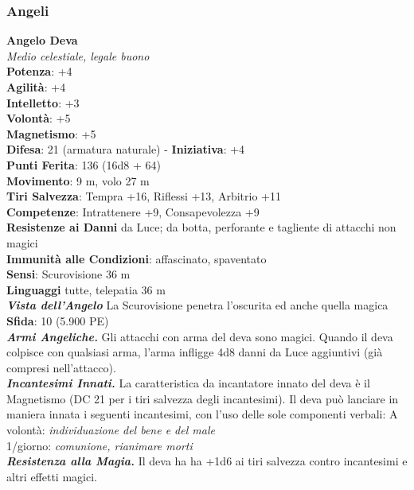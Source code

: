 \begin{multicols}{2}


\subsubsection{Angeli}

\medskip\textbf{Angelo Deva}\\
\emph{Medio celestiale, legale buono}\\
\textbf{Potenza}: +4\\
\textbf{Agilità}: +4\\
\textbf{Intelletto}: +3\\
\textbf{Volontà}: +5\\
\textbf{Magnetismo}: +5\\
\textbf{Difesa}: 21 (armatura naturale) - \textbf{Iniziativa}: +4\\
\textbf{Punti Ferita}: 136 (16d8 + 64)\\
\textbf{Movimento}: 9 m, volo 27 m\\
\textbf{Tiri Salvezza}: Tempra +16, Riflessi +13, Arbitrio +11\\
\textbf{Competenze}: Intrattenere +9, Consapevolezza +9\\
\textbf{Resistenze ai Danni} da Luce; da botta, perforante e tagliente di attacchi non magici\\
\textbf{Immunità alle Condizioni}: affascinato, spaventato\\
\textbf{Sensi}: Scurovisione 36 m\\
\textbf{Linguaggi} tutte, telepatia 36 m\\
\emph{\textbf{Vista dell'Angelo}} La Scurovisione penetra l'oscurita ed anche quella magica\\
\textbf{Sfida}: 10 (5.900 PE)\smallskip\\
\emph{\textbf{Armi Angeliche.}} Gli attacchi con arma del deva sono magici. Quando il deva colpisce con qualsiasi arma, l'arma infligge 4d8 danni da Luce aggiuntivi (già compresi nell'attacco).\\
\emph{\textbf{Incantesimi Innati.}} La caratteristica da incantatore innato del deva è il Magnetismo (DC  21 per i tiri salvezza degli incantesimi). Il deva può lanciare in maniera innata i seguenti incantesimi, con l'uso delle sole componenti verbali: 
A volontà: \emph{individuazione del bene e del male}\\
1/giorno: \emph{comunione, rianimare morti}\\
\emph{\textbf{Resistenza alla Magia.}} Il deva ha ha +1d6 ai tiri salvezza contro incantesimi e altri effetti magici.\\

\end{multicols}
